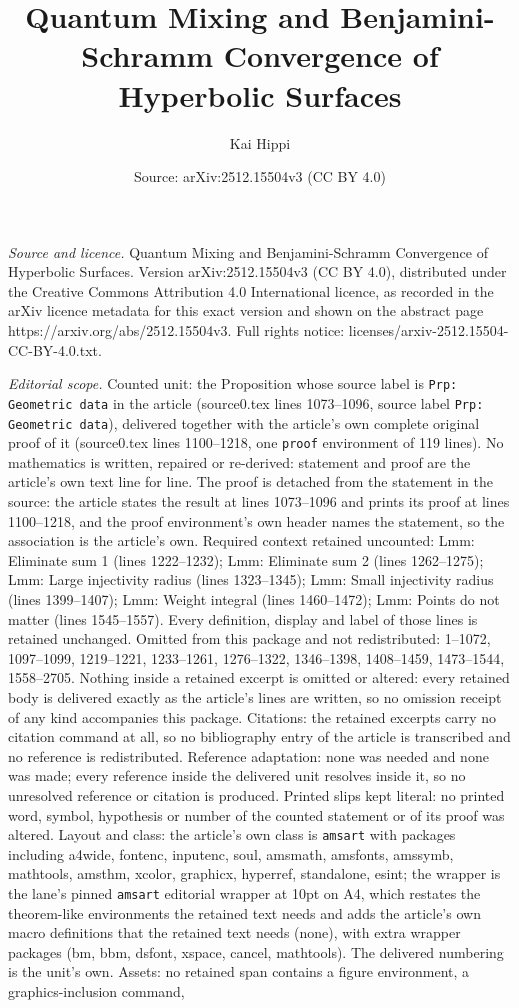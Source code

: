 \documentclass[10pt,a4paper]{amsart}
\title[Quantum Mixing and Benjamini-Schramm Convergence of Hyperbol]{Quantum Mixing and Benjamini-Schramm Convergence of Hyperbolic Surfaces}
\author{Kai Hippi}
\date{Source: arXiv:2512.15504v3 (CC BY 4.0)}
\begin{document}
\maketitle

\noindent\emph{Source and licence.} Quantum Mixing and Benjamini-Schramm Convergence of Hyperbolic Surfaces. Version arXiv:2512.15504v3 (CC BY 4.0), distributed under the Creative Commons Attribution 4.0 International licence, as recorded in the arXiv licence metadata for this exact version and shown on the abstract page https://arxiv.org/abs/2512.15504v3. Full rights notice: licenses/arxiv-2512.15504-CC-BY-4.0.txt.\par\smallskip

\noindent\textit{Editorial scope.} Counted unit: the Proposition whose source label is \texttt{Prp: Geometric data} in the article (source0.tex lines 1073--1096, source label \texttt{Prp: Geometric data}), delivered together with the article's own complete original proof of it (source0.tex lines 1100--1218, one \texttt{proof} environment of 119 lines). No mathematics is written, repaired or re-derived: statement and proof are the article's own text line for line. The proof is detached from the statement in the source: the article states the result at lines 1073--1096 and prints its proof at lines 1100--1218, and the proof environment's own header names the statement, so the association is the article's own. Required context retained uncounted: Lmm: Eliminate sum 1 (lines 1222--1232); Lmm: Eliminate sum 2 (lines 1262--1275); Lmm: Large injectivity radius (lines 1323--1345); Lmm: Small injectivity radius (lines 1399--1407); Lmm: Weight integral (lines 1460--1472); Lmm: Points do not matter (lines 1545--1557). Every definition, display and label of those lines is retained unchanged. Omitted from this package and not redistributed: 1--1072, 1097--1099, 1219--1221, 1233--1261, 1276--1322, 1346--1398, 1408--1459, 1473--1544, 1558--2705. Nothing inside a retained excerpt is omitted or altered: every retained body is delivered exactly as the article's lines are written, so no omission receipt of any kind accompanies this package. Citations: the retained excerpts carry no citation command at all, so no bibliography entry of the article is transcribed and no reference is redistributed. Reference adaptation: none was needed and none was made; every reference inside the delivered unit resolves inside it, so no unresolved reference or citation is produced. Printed slips kept literal: no printed word, symbol, hypothesis or number of the counted statement or of its proof was altered. Layout and class: the article's own class is \texttt{amsart} with packages including a4wide, fontenc, inputenc, soul, amsmath, amsfonts, amssymb, mathtools, amsthm, xcolor, graphicx, hyperref, standalone, esint; the wrapper is the lane's pinned \texttt{amsart} editorial wrapper at 10pt on A4, which restates the theorem-like environments the retained text needs and adds the article's own macro definitions that the retained text needs (none), with extra wrapper packages (bm, bbm, dsfont, xspace, cancel, mathtools). The delivered numbering is the unit's own. Assets: no retained span contains a figure environment, a graphics-inclusion command, 
\end{document}
